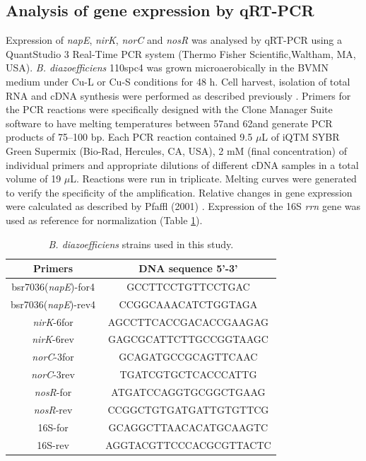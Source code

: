 \documentclass[a4paper,11pt]{article}
\begin{document}
\subsection{Analysis of gene expression by qRT-PCR}
Expression of {\em napE}, {\em nirK}, {\em norC} and {\em nosR} was analysed by qRT-PCR using a QuantStudio
3 Real-Time PCR system (Thermo Fisher Scientific,Waltham, MA, USA). {\em B. diazoefficiens}
110spc4 was grown microaerobically in the BVMN medium under Cu-L or Cu-S conditions
for 48 h. Cell harvest, isolation of total RNA and cDNA synthesis were performed as
described previously \cite{mesa2003bradyrhizobium}. Primers for the PCR reactions were specifically designed
with the Clone Manager Suite software to have melting temperatures between 57\textcelsius and
62\textcelsius and generate PCR products of 75–100 bp. Each PCR reaction contained 9.5 $\mu$L of
iQTM SYBR Green Supermix (Bio-Rad, Hercules, CA, USA), 2 mM (final concentration) of
individual primers and appropriate dilutions of different cDNA samples in a total volume
of 19 $\mu$L. Reactions were run in triplicate. Melting curves were generated to verify the
specificity of the amplification. Relative changes in gene expression were calculated as
described by Pfaffl (2001) \cite{pfaffl2002relative}. Expression of the 16S {\em rrn} gene was used as reference for
normalization (Table \ref{tab:table2}).

\begin{table}[h!]
\centering
\caption{{\em B. diazoefficiens} strains used in this study.}
\begin{tabular}{|c|c|}
\hline
\textbf{Primers} & \textbf{DNA sequence 5'-3'} \\
\hline
bsr7036({\em napE})-for4 & GCCTTCCTGTTCCTGAC \\
\hline
bsr7036({\em napE})-rev4 & CCGGCAAACATCTGGTAGA \\
\hline
{\em nirK}-6for & AGCCTTCACCGACACCGAAGAG \\
\hline
{\em nirK}-6rev & GAGCGCATTCTTGCCGGTAAGC \\
\hline
{\em norC}-3for & GCAGATGCCGCAGTTCAAC \\
\hline
{\em norC}-3rev & TGATCGTGCTCACCCATTG \\
\hline
{\em nosR}-for & ATGATCCAGGTGCGGCTGAAG \\
\hline
{\em nosR}-rev & CCGGCTGTGATGATTGTGTTCG \\
\hline
16S-for & GCAGGCTTAACACATGCAAGTC \\
\hline
16S-rev & AGGTACGTTCCCACGCGTTACTC \\
\hline
\end{tabular}
\label{tab:table2}
\end{table}
\end{document}

